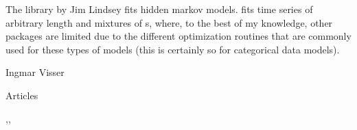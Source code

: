 \documentclass[a4paper]{book}
\begin{document}
\begin{Note}\relax
The  library
by Jim Lindsey fits hidden markov models.   fits time series of
arbitrary length and mixtures of s, where, to the best of my
knowledge, other packages are limited due to the different optimization
routines that are commonly used for these types of models (this is
certainly so for categorical data models).
\end{Note}
\begin{Author}\relax
Ingmar Visser
\end{Author}
\begin{References}\relax
Articles
\end{References}
\begin{SeeAlso}\relax
{},,
\end{SeeAlso}
\end{document}
